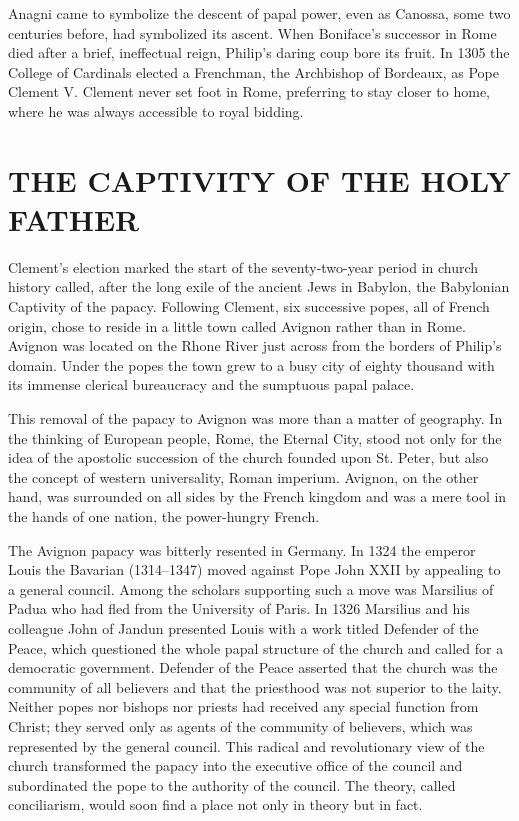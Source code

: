Anagni came to symbolize the descent of papal power, even as Canossa, some two centuries before, had
symbolized its ascent. When Boniface’s successor in Rome died after a brief, ineffectual reign,
Philip’s daring coup bore its fruit. In 1305 the College of Cardinals elected a Frenchman, the
Archbishop of Bordeaux, as Pope Clement V. Clement never set foot in Rome, preferring to stay closer
to home, where he was always accessible to royal bidding.

\section{THE CAPTIVITY OF THE HOLY FATHER}

Clement’s election marked the start of the seventy-two-year period in church history called, after
the long exile of the ancient Jews in Babylon, the Babylonian Captivity of the papacy. Following
Clement, six successive popes, all of French origin, chose to reside in a little town called Avignon
rather than in Rome. Avignon was located on the Rhone River just across from the borders of Philip’s
domain. Under the popes the town grew to a busy city of eighty thousand with its immense clerical
bureaucracy and the sumptuous papal palace.

This removal of the papacy to Avignon was more than a matter of geography. In the thinking of
European people, Rome, the Eternal City, stood not only for the idea of the apostolic succession of
the church founded upon St. Peter, but also the concept of western universality, Roman imperium.
Avignon, on the other hand, was surrounded on all sides by the French kingdom and was a mere tool in
the hands of one nation, the power-hungry French.

The Avignon papacy was bitterly resented in Germany. In 1324 the emperor Louis the Bavarian
(1314–1347) moved against Pope John XXII by appealing to a general council. Among the scholars
supporting such a move was Marsilius of Padua who had fled from the University of Paris. In 1326
Marsilius and his colleague John of Jandun presented Louis with a work titled Defender of the Peace,
which questioned the whole papal structure of the church and called for a democratic government.
Defender of the Peace asserted that the church was the community of all believers and that the
priesthood was not superior to the laity. Neither popes nor bishops nor priests had received any
special function from Christ; they served only as agents of the community of believers, which was
represented by the general council. This radical and revolutionary view of the church transformed
the papacy into the executive office of the council and subordinated the pope to the authority of
the council. The theory, called conciliarism, would soon find a place not only in theory but in
fact.

